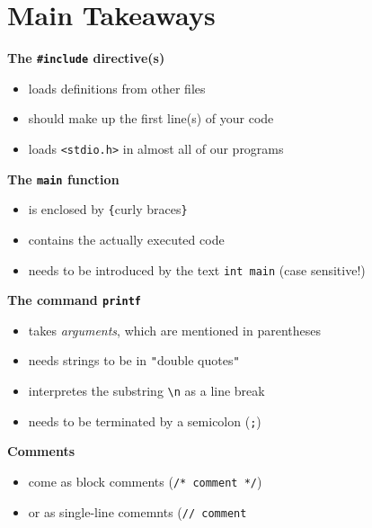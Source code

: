 \section{Main Takeaways}
\begin{defbox}
\textbf{The \texttt{\#include} directive(s)}
\begin{itemize}
\setlength\itemsep{0pt}
\item loads definitions from other files
\item should make up the first line(s) of your code
\item loads \texttt{<stdio.h>} in almost all of our programs
\end{itemize}

\textbf{The \texttt{main} function}
\vspace{-6pt}
\begin{itemize}
\setlength\itemsep{0pt}
\item is enclosed by \texttt{\{}curly braces\texttt{\}}
\item contains the actually executed code
\item needs to be introduced by the text \texttt{int main} (case sensitive!)
\end{itemize}

\textbf{The command \texttt{printf}}
\vspace{-6pt}
\begin{itemize}
\setlength\itemsep{0pt}
\item takes \emph{arguments}, which are mentioned in parentheses
\item needs strings to be in \texttt{"}double quotes\texttt{"}
\item interpretes the substring \texttt{\textbackslash n} as a line break
\item needs to be terminated by a semicolon (\texttt{;})
\end{itemize}

\textbf{Comments}
\begin{itemize}
\vspace{-6pt}
\setlength\itemsep{0pt}
\item come as block comments (\texttt{/* comment */})
\item or as single-line comemnts (\texttt{// comment}
\end{itemize}
\end{defbox}


